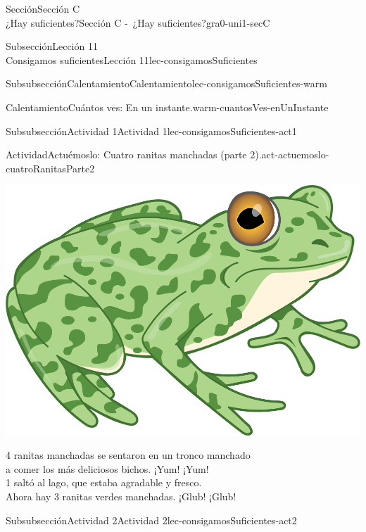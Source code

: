 \begin{sectionptx}{Sección}{{\Large Sección C\\}¿Hay suficientes?}{}{Sección C -~¿Hay suficientes?}{}{}{gra0-uni1-secC}
\begin{subsectionptx}{Subsección}{{\normalsize Lección 11\\[-0.05cm]}Consigamos suficientes}{}{Lección 11}{}{}{lec-consigamosSuficientes}
\begin{subsubsectionptx}{Subsubsección}{Calentamiento}{}{Calentamiento}{}{}{lec-consigamosSuficientes-warm}
\begin{exploration}{Calentamiento}{Cuántos ves: En un instante.}{warm-cuantosVes-enUnInstante}
\begin{sidebyside}{2}{0}{0}{0}
\begin{sbspanel}{0.5}
\end{sbspanel}%
\end{sidebyside}%
\end{exploration}%
\end{subsubsectionptx}
%
%
\typeout{************************************************}
\typeout{************************************************}
%
\clearpage
\begin{subsubsectionptx}{Subsubsección}{Actividad 1}{}{Actividad 1}{}{}{lec-consigamosSuficientes-act1}
\begin{activity}{Actividad}{Actuémoslo: Cuatro ranitas manchadas (parte 2).}{act-actuemoslo-cuatroRanitasParte2}%
\begin{image}{0.275}{0.45}{0.275}{}%
\includegraphics[max width=\linewidth, center]{external/png-source/RANA-VERDE.png}
\end{image}%
%
\par
\small
\vspace{2ex}
4 ranitas manchadas se sentaron en un tronco manchado\\
 a comer los más deliciosos bichos. ¡Yum! ¡Yum!\\
 1 saltó al lago, que estaba agradable y fresco.\\
 Ahora hay 3 ranitas verdes manchadas. ¡Glub! ¡Glub!%
\end{activity}%
\end{subsubsectionptx}
%
%
\typeout{************************************************}
\typeout{************************************************}
%
\begin{subsubsectionptx}{Subsubsección}{Actividad 2}{}{Actividad 2}{}{}{lec-consigamosSuficientes-act2}

\end{subsubsectionptx}
\end{subsectionptx}
\end{sectionptx}
